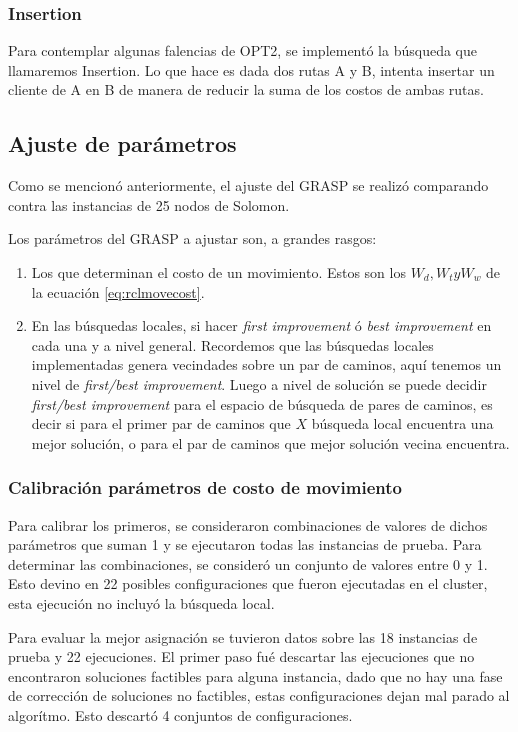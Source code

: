 \documentclass{article}
\begin{document}
  \subsubsection*{Insertion}

  Para contemplar algunas falencias de OPT2, se implementó la búsqueda que llamaremos Insertion. Lo que hace es dada dos rutas A y B, intenta insertar un cliente de A en B de manera de reducir la suma de los costos de ambas rutas.

  \subsection*{Ajuste de parámetros}

  Como se mencionó anteriormente, el ajuste del GRASP se realizó comparando contra las instancias de 25 nodos de Solomon.
  
  Los parámetros del GRASP a ajustar son, a grandes rasgos:

  \begin{enumerate}
    \item {Los que determinan el costo de un movimiento. Estos son los $W_d, W_t y W_w$ de la ecuación \ref{eq:rclmovecost}}.
    \item {En las búsquedas locales, si hacer {\it first improvement} ó {\it best improvement} en cada una y a nivel general. Recordemos que las búsquedas locales implementadas genera vecindades sobre un par de caminos, aquí tenemos un nivel de {\it first/best improvement}. Luego a nivel de solución se puede decidir {\it first/best improvement} para el espacio de búsqueda de pares de caminos, es decir si para el primer par de caminos que $X$ búsqueda local encuentra una mejor solución, o para el par de caminos que mejor solución vecina encuentra.}
  \end{enumerate}

  \subsubsection*{Calibración parámetros de costo de movimiento}

  Para calibrar los primeros, se consideraron combinaciones de valores de dichos parámetros que suman 1 y se ejecutaron todas las instancias de prueba. Para determinar las combinaciones, se consideró un conjunto de valores entre 0 y 1. Esto devino en 22 posibles configuraciones que fueron ejecutadas en el cluster, esta ejecución no incluyó la búsqueda local.

  Para evaluar la mejor asignación se tuvieron datos sobre las 18 instancias de prueba y 22 ejecuciones. El primer paso fué descartar las ejecuciones que no encontraron soluciones factibles para alguna instancia, dado que no hay una fase de corrección de soluciones no factibles, estas configuraciones dejan mal parado al algorítmo. Esto descartó 4 conjuntos de configuraciones.
\end{document}
